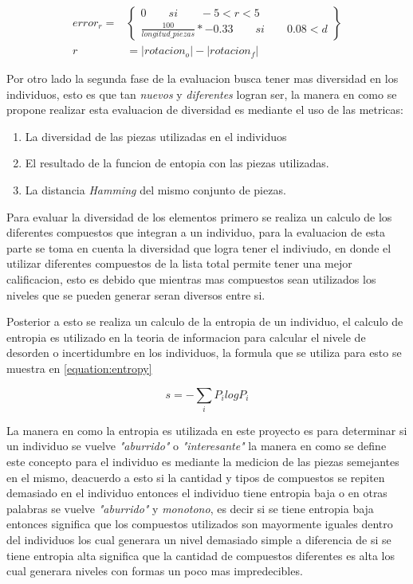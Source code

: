 \begin{equation}
    \begin{split}
      error_{r} = & 
      \begin{Bmatrix}
        0 \qquad si \qquad -5 < r < 5 \\ 
        \frac{100}{longitud\_piezas} * -0.33 \qquad si \qquad 0.08 < d
      \end{Bmatrix} \\
       r & = \left | rotacion_o \right | - \left | rotacion_f \right |
    \end{split}
    \label{equation:error_ang}
\end{equation}

Por otro lado la segunda fase de la evaluacion busca tener mas diversidad en los
individuos, esto es que tan \textit{nuevos} y \textit{diferentes} logran ser, la
manera en como se propone realizar esta evaluacion de diversidad es mediante el
uso de las metricas:
\begin{enumerate}
    \item La diversidad de las piezas utilizadas en el individuos
    \item El resultado de la funcion de entopia con las piezas utilizadas.
    \item La distancia \textit{Hamming} del mismo conjunto de piezas.
\end{enumerate}

Para evaluar la diversidad de los elementos primero se realiza un calculo de los
diferentes compuestos que integran a un individuo, para la evaluacion de esta
parte se toma en cuenta la diversidad que logra tener el indiviudo, en donde el
utilizar diferentes compuestos de la lista total permite tener una mejor
calificacion, esto es debido que mientras mas compuestos sean utilizados los
niveles que se pueden generar seran diversos entre si.

Posterior a esto se realiza un calculo de la entropia de un individuo, el
calculo de entropia es utilizado en la teoria de informacion para calcular el
nivele de desorden o incertidumbre en los individuos, la formula que se utiliza
para esto se muestra en \ref{equation:entropy}

\begin{equation}
  s = -\sum _{i} P_i log P_i
  \label{equation:entropy}
\end{equation}

La manera en como la entropia es utilizada en este proyecto es para determinar
si un individuo se vuelve \textit{"aburrido"} o \textit{"interesante"} la manera
en como se define este concepto para el individuo es mediante la medicion de las
piezas semejantes en el mismo, deacuerdo a esto si la cantidad y tipos de
compuestos se repiten demasiado en el individuo entonces el individuo tiene
entropia baja o en otras palabras se vuelve \textit{"aburrido"} y
\textit{monotono}, es decir si se tiene entropia baja entonces significa que los
compuestos utilizados son mayormente iguales dentro del individuos los cual
generara un nivel demasiado simple a diferencia de si se tiene entropia alta
significa que la cantidad de compuestos diferentes es alta los cual generara
niveles con formas un poco mas impredecibles.

